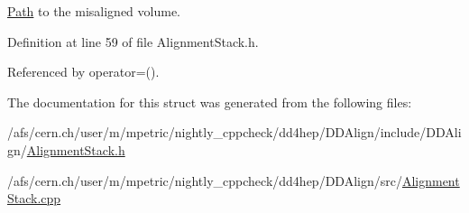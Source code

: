\hyperlink{class_d_d4hep_1_1_path}{Path} to the misaligned volume. 

Definition at line 59 of file AlignmentStack.h.

Referenced by operator=().

The documentation for this struct was generated from the following files:\begin{DoxyCompactItemize}
\item 
/afs/cern.ch/user/m/mpetric/nightly\_\-cppcheck/dd4hep/DDAlign/include/DDAlign/\hyperlink{_alignment_stack_8h}{AlignmentStack.h}\item 
/afs/cern.ch/user/m/mpetric/nightly\_\-cppcheck/dd4hep/DDAlign/src/\hyperlink{_alignment_stack_8cpp}{AlignmentStack.cpp}\end{DoxyCompactItemize}
